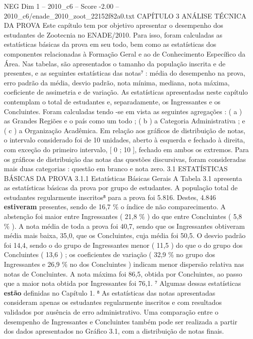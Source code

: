 \begin{textsample}{NEG Dim 1 – 2010\_c6 – Score -2.00 – 2010\_c6/enade\_2010\_zoot\_22152f82a0.txt}  \label{ex:f1_neg_276}
CAPÍTULO 3 ANÁLISE TÉCNICA DA PROVA Este capítulo tem por objetivo apresentar o desempenho dos estudantes de Zootecnia no ENADE/2010.
Para isso, foram calculadas as estatísticas básicas da prova em seu todo, bem como as estatísticas dos componentes relacionadas à Formação Geral e ao de Conhecimento Específico da Área.
Nas tabelas, são apresentados o tamanho da população inscrita e de presentes, e as seguintes estatísticas das notas⁷ : média do desempenho na prova, erro padrão da média, desvio padrão, nota mínima, mediana, nota máxima, coeficiente de assimetria e de variação.
As estatísticas apresentadas neste capítulo contemplam o total de estudantes e, separadamente, os Ingressantes e os Concluintes.
Foram calculadas tendo -se em vista as seguintes agregações : ( a ) as Grandes Regiões e o país como um todo ; ( b ) a Categoria Administrativa ; e ( c ) a Organização Acadêmica.
Em relação aos gráficos de distribuição de notas, o intervalo considerado foi de 10 unidades, aberto à esquerda e fechado à direita, com exceção do primeiro intervalo, [ 0 ; 10 ], fechado em ambos os extremos.
Para os gráficos de distribuição das notas das questões discursivas, foram consideradas mais duas categorias : questão em branco e nota zero. 3.1 ESTATÍSTICAS BÁSICAS DA PROVA 3.1.1 Estatísticas Básicas Gerais A Tabela 3.1 apresenta as estatísticas básicas da prova por grupo de estudantes.
A população total de estudantes regularmente inscritos⁸ para a prova foi 5.816.
Destes, 4.846 \textbf{estiveram} presentes, sendo de 16,7 \% o índice de não comparecimento.
A abstenção foi maior entre Ingressantes ( 21,8 \% ) do que entre Concluintes ( 5,8 \% ).
A nota média de toda a prova foi 40,7, sendo que os Ingressantes obtiveram média mais baixa, 35,0, que os Concluintes, cuja média foi 50,5.
O desvio padrão foi 14,4, sendo o do grupo de Ingressantes menor ( 11,5 ) do que o do grupo dos Concluintes ( 13,6 ) ; os coeficientes de variação ( 32,9 \% no grupo dos Ingressantes e 26,9 \% no dos Concluintes ) indicam menor dispersão relativa nas notas de Concluintes.
A nota máxima foi 86,5, obtida por Concluintes, ao passo que a maior nota obtida por Ingressantes foi 76,1. ⁷ Algumas dessas estatísticas \textbf{estão} definidas no Capítulo 1. ⁸ As estatísticas das notas apresentadas consideram apenas os estudantes regularmente inscritos e com resultados validados por ausência de erro administrativo.
Uma comparação entre o desempenho de Ingressantes e Concluintes também pode ser realizada a partir dos dados apresentados no Gráfico 3.1, com a distribuição de notas finais.

\end{textsample}
